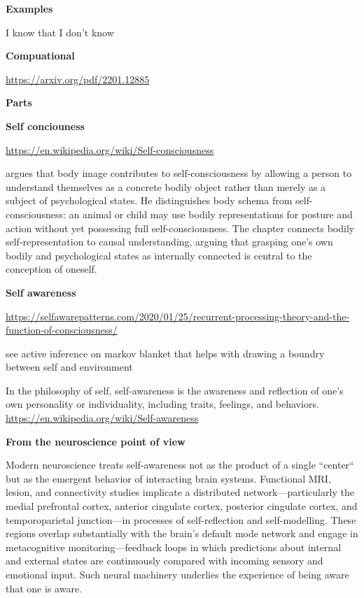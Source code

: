 \documentclass{book}
\providecommand{\ProjectDeepHeading}[2]{%
    \par\medskip\noindent\textbf{#2}\par\smallskip
}
\begin{document}
    \ProjectDeepHeading{6}{Examples}
        I know that I don't know

\ProjectDeepHeading{1}{Compuational}


\url{https://arxiv.org/pdf/2201.12885}

\ProjectDeepHeading{1}{Parts}

\ProjectDeepHeading{2}{Self conciouness}


\url{https://en.wikipedia.org/wiki/Self-consciousness}



    
    \cite{campbell-1995-the-body-image-and-self-consciousness} argues that body image contributes to self-consciousness by allowing a person to understand themselves as a concrete bodily object rather than merely as a subject of psychological states. He distinguishes body schema from self-consciousness: an animal or child may use bodily representations for posture and action without yet possessing full self-consciousness. The chapter connects bodily self-representation to causal understanding, arguing that grasping one’s own bodily and psychological states as internally connected is central to the conception of oneself.

\ProjectDeepHeading{3}{Self awareness}


\url{https://selfawarepatterns.com/2020/01/25/recurrent-processing-theory-and-the-function-of-consciousness/}
    
    see active inference on markov blanket that helps with drawing a boundry between self and environment
    
    In the philosophy of self, self-awareness is the awareness and reflection of one's own personality or individuality, including traits, feelings, and behaviors. \url{https://en.wikipedia.org/wiki/Self-awareness}
    
    \ProjectDeepHeading{6}{From the neuroscience point of view}
    Modern neuroscience treats self-awareness not as the product of a single ``center`` but as the emergent behavior of interacting brain systems. Functional MRI, lesion, and connectivity studies implicate a distributed network—particularly the medial prefrontal cortex, anterior cingulate cortex, posterior cingulate cortex, and temporoparietal junction—in processes of self-reflection and self-modelling. These regions overlap substantially with the brain's default mode network and engage in metacognitive monitoring—feedback loops in which predictions about internal and external states are continuously compared with incoming sensory and emotional input. Such neural machinery underlies the experience of being aware that one is aware.\cite{fleming-frith-2014-metacognition}
    
\end{document}
